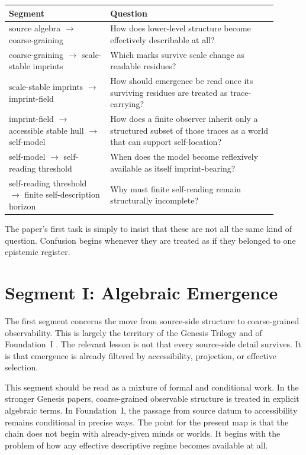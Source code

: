 \documentclass[12pt]{article}
\begin{document}
\begin{center}
\begin{tabular}{P{0.34\linewidth}P{0.56\linewidth}}
\toprule
\textbf{Segment} & \textbf{Question} \\
\midrule
source algebra $\to$ coarse-graining & How does lower-level structure become effectively describable at all? \\
coarse-graining $\to$ scale-stable imprints & Which marks survive scale change as readable residues? \\
scale-stable imprints $\to$ imprint-field & How should emergence be read once its surviving residues are treated as trace-carrying? \\
imprint-field $\to$ accessible stable hull $\to$ self-model & How does a finite observer inherit only a structured subset of those traces as a world that can support self-location? \\
self-model $\to$ self-reading threshold & When does the model become reflexively available as itself imprint-bearing? \\
self-reading threshold $\to$ finite self-description horizon & Why must finite self-reading remain structurally incomplete? \\
\bottomrule
\end{tabular}
\end{center}

The paper's first task is simply to insist that these are not all the same kind of question. Confusion begins whenever they are treated as if they belonged to one epistemic register.

\section{Segment I: Algebraic Emergence}

The first segment concerns the move from source-side structure to coarse-grained observability. This is largely the territory of the Genesis Trilogy and of Foundation~I \cite{HAFFA,HAFFD,FoundationI}. The relevant lesson is not that every source-side detail survives. It is that emergence is already filtered by accessibility, projection, or effective selection.

This segment should be read as a mixture of formal and conditional work. In the stronger Genesis papers, coarse-grained observable structure is treated in explicit algebraic terms. In Foundation~I, the passage from source datum to accessibility remains conditional in precise ways. The point for the present map is that the chain does not begin with already-given minds or worlds. It begins with the problem of how any effective descriptive regime becomes available at all.
\end{document}
